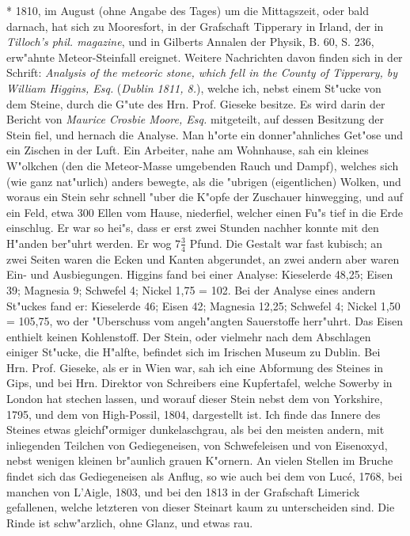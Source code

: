 \documentclass[a4paper, 11pt, oneside, polutonikogreek, german]{article}
\begin{document}
* 1810, im August (ohne Angabe des Tages) um die Mittagszeit, oder bald darnach, hat sich zu Mooresfort, in der Grafschaft Tipperary in Irland, der in \emph{Tilloch's phil. magazine}, und in Gilberts Annalen der Physik, B. 60, S. 236, erw"ahnte Meteor-Steinfall ereignet. Weitere Nachrichten davon finden sich in der Schrift: \emph{Analysis of the meteoric stone, which fell in the County of Tipperary, by William Higgins, Esq.} (\emph{Dublin 1811, 8.}), welche ich, nebst einem St"ucke von dem Steine, durch die G"ute des Hrn. Prof. Gieseke besitze. Es wird darin der Bericht von \emph{Maurice Crosbie Moore, Esq.} mitgeteilt, auf dessen Besitzung der Stein fiel, und hernach die Analyse. Man h"orte ein donner"ahnliches Get"ose und ein Zischen in der Luft. Ein Arbeiter, nahe am Wohnhause, sah ein kleines W"olkchen (den die Meteor-Masse umgebenden Rauch und Dampf), welches sich (wie ganz nat"urlich) anders bewegte, als die "ubrigen (eigentlichen) Wolken, und woraus ein Stein sehr schnell "uber die K"opfe der Zuschauer hinwegging, und auf ein Feld, etwa 300 Ellen vom Hause, niederfiel, welcher einen Fu"s tief in die Erde einschlug. Er war so hei"s, dass er erst zwei Stunden nachher konnte mit den H"anden ber"uhrt werden. Er wog $\mathfrak{7\frac{3}{4}}$ Pfund. Die Gestalt war fast kubisch; an zwei Seiten waren die Ecken und Kanten abgerundet, an zwei andern aber waren Ein- und Ausbiegungen. Higgins fand bei einer Analyse: Kieselerde 48,25; Eisen 39; Magnesia 9; Schwefel 4; Nickel 1,75 = 102. Bei der Analyse eines andern St"uckes fand er: Kieselerde 46; Eisen 42; Magnesia 12,25; Schwefel 4; Nickel 1,50 = 105,75, wo der "Uberschuss vom angeh"angten Sauerstoffe herr"uhrt. Das Eisen enthielt keinen Kohlenstoff. Der Stein, oder vielmehr nach dem Abschlagen einiger St"ucke, die H"alfte, befindet sich im Irischen Museum zu Dublin. Bei Hrn. Prof. Gieseke, als er in Wien war, sah ich eine Abformung des Steines in Gips, und bei Hrn. Direktor von Schreibers eine Kupfertafel, welche Sowerby in London hat stechen lassen, und worauf dieser Stein nebst dem von Yorkshire, 1795, und dem von High-Possil, 1804, dargestellt ist. Ich finde das Innere des Steines etwas gleichf"ormiger dunkelaschgrau, als bei den meisten andern, mit inliegenden Teilchen von Gediegeneisen, von Schwefeleisen und von Eisenoxyd, nebst wenigen kleinen br"aunlich grauen K"ornern. An vielen Stellen im Bruche findet sich das Gediegeneisen als Anflug, so wie auch bei dem von Lucé, 1768, bei manchen von L'Aigle, 1803, und bei den 1813 in der Grafschaft Limerick gefallenen, welche letzteren von dieser Steinart kaum zu unterscheiden sind. Die Rinde ist schw"arzlich, ohne Glanz, und etwas rau.
\end{document}

